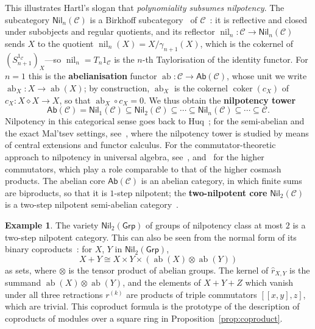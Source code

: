 \documentclass[reqno,a4paper]{amsart}
\theoremstyle{plain}
\theoremstyle{definition}
\newtheorem{example}[subsection]{Example}
\newcommand{\defn}{\textbf}
\newcommand{\C}{\ensuremath{\mathcal{C}}}
\newcommand{\Ab}{\ensuremath{\mathsf{Ab}}}
\newcommand{\Grp}{\ensuremath{\mathsf{Grp}}}
\newcommand{\Nil}{\ensuremath{\mathsf{Nil}}}
\DeclareMathOperator{\ab}{ab}
\DeclareMathOperator{\nil}{nil}
\DeclareMathOperator{\coker}{coker}
\newcommand{\cosmash}{\ensuremath{\diamond}}
\newcommand{\cm}[2]{\ensuremath{\hat{r}_{#1,#2}}}          %
\newcommand{\cc}[1]{\ensuremath{c_{#1}}}                    %
\begin{document}
This illustrates Hartl's slogan that \emph{polynomiality subsumes nilpotency}. The subcategory \(\Nil_{n}(\C)\) is a Birkhoff subcategory~\cite{Janelidze-Kelly} of \(\C\)~\cite{HVdL}: it is reflective and closed under subobjects and regular quotients, and its reflector \(\nil_{n}\colon \C\to\Nil_{n}(\C)\) sends \(X\) to the quotient \(\nil_{n}(X)=X/\gamma_{n+1}(X)\), which is the cokernel of \((S^{1_{\C}}_{n+1})_{X}\)---so \(\nil_{n}=T_{n}1_{\C}\) is the \(n\)-th Taylorisation of the identity functor. For \(n=1\) this is the \defn{abelianisation} functor \(\ab\colon \C\to\Ab(\C)\), whose unit we write \(\ab_{X}\colon X\to\ab(X)\); by construction, \(\ab_{X}\) is the cokernel \(\coker(\cc{X})\) of \(\cc{X}\colon X\cosmash X\to X\), so that \(\ab_{X}\circ\cc{X}=0\). We thus obtain the \defn{nilpotency tower}
\[
  \Ab(\C)=\Nil_{1}(\C)\subseteq\Nil_{2}(\C)\subseteq\cdots\subseteq\Nil_{n}(\C)\subseteq\cdots\subseteq\C\text{.}
\]
Nilpotency in this categorical sense goes back to Huq~\cite{Huq}; for the semi-abelian and the exact Mal'tsev settings, see~\cite{Bourn-Gran, BeBou}, where the nilpotency tower is studied by means of central extensions and functor calculus. For the commutator-theoretic approach to nilpotency in universal algebra, see~\cite{Sm, Freese-McKenzie}, and~\cite{Higgins} for the higher commutators, which play a role comparable to that of the higher cosmash products. The abelian core \(\Ab(\C)\) is an abelian category, in which finite sums are biproducts, so that it is \(1\)-step nilpotent; the \defn{two-nilpotent core} \(\Nil_{2}(\C)\) is a two-step nilpotent semi-abelian category~\cite[Subsection~2.3]{DHVdL}.

\begin{example}\label{ex:nilpotent-groups}
  The variety \(\Nil_{2}(\Grp)\) of groups of nilpotency class at most \(2\) is a two-step nilpotent category. This can also be seen from the normal form of its binary coproducts~\cite[Proposition~1.2]{Jibladze-Pirashvili}: for \(X\), \(Y\) in \(\Nil_{2}(\Grp)\),
  \[
    X+Y\cong X\times Y\times(\ab(X)\otimes\ab(Y))
  \]
  as sets, where \(\otimes\) is the tensor product of abelian groups. The kernel of \(\cm{X}{Y}\) is the summand \(\ab(X)\otimes\ab(Y)\), and the elements of \(X+Y+Z\) which vanish under all three retractions \(r^{(k)}\) are products of triple commutators \([[x,y],z]\), which are trivial. This coproduct formula is the prototype of the description of coproducts of modules over a square ring in Proposition~\ref{prop:coproduct}.
\end{example}
\end{document}
